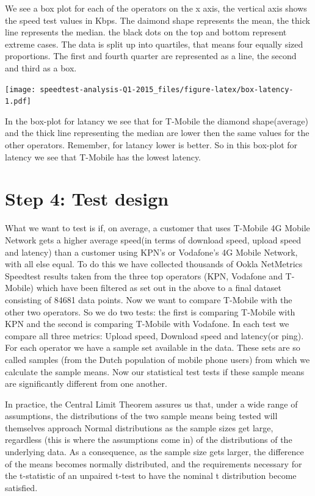 \documentclass[]{article}
\begin{document}
We see a box plot for each of the operators on the x axis, the vertical
axis shows the speed test values in Kbps. The daimond shape represents
the mean, the thick line represents the median. the black dots on the
top and bottom represent extreme cases. The data is split up into
quartiles, that means four equally sized proportions. The first and
fourth quarter are represented as a line, the second and third as a box.

\texttt{[image: speedtest-analysis-Q1-2015\_files/figure-latex/box-latency-1.pdf]}

In the box-plot for latancy we see that for T-Mobile the diamond
shape(average) and the thick line representing the median are lower then
the same values for the other operators. Remember, for latancy lower is
better. So in this box-plot for latency we see that T-Mobile has the
lowest latency.

\newpage

\section{Step 4: Test design}\label{step-4-test-design}

What we want to test is if, on average, a customer that uses T-Mobile 4G
Mobile Network gets a higher average speed(in terms of download speed,
upload speed and latency) than a customer using KPN's or Vodafone's 4G
Mobile Network, with all else equal. To do this we have collected
thousands of Ookla NetMetrics Speedtest results taken from the three top
operators (KPN, Vodafone and T-Mobile) which have been filtered as set
out in the above to a final dataset consisting of 84681 data points. Now
we want to compare T-Mobile with the other two operators. So we do two
tests: the first is comparing T-Mobile with KPN and the second is
comparing T-Mobile with Vodafone. In each test we compare all three
metrics: Upload speed, Download speed and latency(or ping). For each
operator we have a sample set available in the data. These sets are so
called samples (from the Dutch population of mobile phone users) from
which we calculate the sample means. Now our statistical test tests if
these sample means are significantly different from one another.

In practice, the Central Limit Theorem assures us that, under a wide
range of assumptions, the distributions of the two sample means being
tested will themselves approach Normal distributions as the sample sizes
get large, regardless (this is where the assumptions come in) of the
distributions of the underlying data. As a consequence, as the sample
size gets larger, the difference of the means becomes normally
distributed, and the requirements necessary for the t-statistic of an
unpaired t-test to have the nominal t distribution become satisfied.
\end{document}
